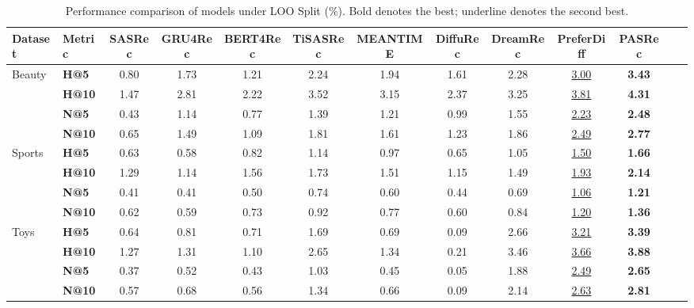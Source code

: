 \documentclass[sigconf,nonacm]{acmart}
\newcommand{\modelname}{PASRec}
\begin{document}
\begin{table}[htbp]
\small
\centering
\caption{Performance comparison of models under LOO Split (\%). Bold denotes the best; underline denotes the second best.}
\label{tab:LOO_compare}
\begin{adjustbox}{max width=\textwidth}
\begin{tabular}{llccccccccccc}
\toprule
\textbf{Dataset} & \textbf{Metric} & \textbf{SASRec} & \textbf{GRU4Rec} & \textbf{BERT4Rec} & \textbf{TiSASRec} & \textbf{MEANTIME} & \textbf{DiffuRec} & \textbf{DreamRec} & \textbf{PreferDiff} & \textbf{\modelname} \\
\midrule

\multirow{4}{*}{Beauty}
& \textbf{H@5}     & 0.80 & 1.73 & 1.21 & 2.24  & 1.94 & 1.61 & 2.28 & \underline{3.00} & \textbf{3.43} \\
& \textbf{H@10}    & 1.47 & 2.81 & 2.22 & 3.52  & 3.15 & 2.37 & 3.25 & \underline{3.81} & \textbf{4.31} \\
& \textbf{N@5}     & 0.43 & 1.14 & 0.77 & 1.39  & 1.21 & 0.99 & 1.55 & \underline{2.23} & \textbf{2.48} \\
& \textbf{N@10}    & 0.65 & 1.49 & 1.09 & 1.81  & 1.61 & 1.23 & 1.86 & \underline{2.49} & \textbf{2.77} \\
\midrule

\multirow{4}{*}{Sports}
& \textbf{H@5}     & 0.63 & 0.58 & 0.82 & 1.14 & 0.97 & 0.65 & 1.05 & \underline{1.50} & \textbf{1.66} \\
& \textbf{H@10}    & 1.29 & 1.14 & 1.56 & 1.73 & 1.51 & 1.15 & 1.49 & \underline{1.93} & \textbf{2.14} \\
& \textbf{N@5}     & 0.41 & 0.41 & 0.50 & 0.74 & 0.60 & 0.44 & 0.69 & \underline{1.06} & \textbf{1.21} \\
& \textbf{N@10}    & 0.62 & 0.59 & 0.73 & 0.92 & 0.77 & 0.60 & 0.84 & \underline{1.20} & \textbf{1.36} \\
\midrule

\multirow{4}{*}{Toys}
& \textbf{H@5}     & 0.64 & 0.81 & 0.71 & 1.69 & 0.69 & 0.09 & 2.66 & \underline{3.21} & \textbf{3.39} \\
& \textbf{H@10}    & 1.27 & 1.31 & 1.10 & 2.65 & 1.34 & 0.21 & 3.46 & \underline{3.66} & \textbf{3.88} \\
& \textbf{N@5}     & 0.37 & 0.52 & 0.43 & 1.03 & 0.45 & 0.05 & 1.88 & \underline{2.49} & \textbf{2.65} \\
& \textbf{N@10}    & 0.57 & 0.68 & 0.56 & 1.34 & 0.66 & 0.09 & 2.14 & \underline{2.63} & \textbf{2.81} \\
\midrule


\end{tabular}
\end{adjustbox}
\end{table}
\end{document}
